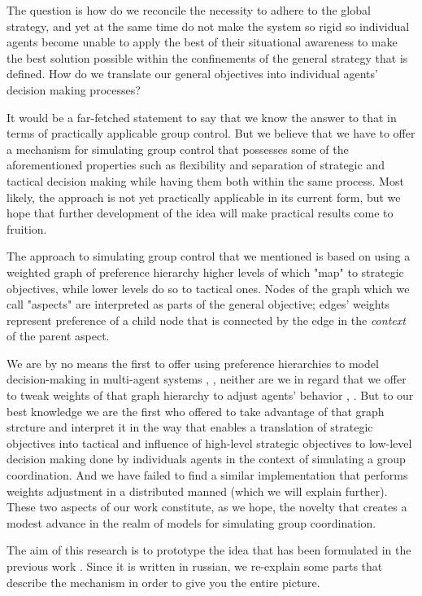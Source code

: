 The question is how do we reconcile the necessity to adhere to the global strategy, and yet at the same time do not make
the system so rigid so individual agents become unable to apply the best of their situational awareness to make the best
solution possible within the confinements of the general strategy that is defined. How do we translate our general
objectives into individual agents' decision making processes?

It would be a far-fetched statement to say that we know the answer to that in terms of practically applicable group
control. But we believe that we have to offer a mechanism for simulating group control that possesses some of the
aforementioned properties such as flexibility and separation of strategic and tactical decision making while having them
both within the same process. Most likely, the approach is not yet practically applicable in its current form, but we
hope that further development of the idea will make practical results come to fruition.

The approach to simulating group control that we mentioned is based on using a weighted graph of preference hierarchy
higher levels of which "map" to strategic objectives, while lower levels do so to tactical ones. Nodes of the graph
which we call "aspects" are interpreted as parts of the general objective; edges' weights represent preference of a
child node that is connected by the edge in the \textit{context} of the parent aspect.

We are by no means the first to offer using preference hierarchies to model decision-making in multi-agent systems
\cite{cartvehishvili-2018-model}, \cite{drakaki-2018-intelligent}, neither are we in regard that we offer to tweak
weights of that graph hierarchy to adjust agents' behavior \cite{zytniewski-2016-application},
\cite{brintrup-2010-behaviour}. But to our best knowledge we are the first who offered to take advantage of that graph
strcture and interpret it in the way that enables a translation of strategic objectives into tactical and influence of
high-level strategic objectives to low-level decision making done by individuals agents in the context of simulating a
group coordination. And we have failed to find a similar implementation that performs weights adjustment in a
distributed manned (which we will explain further). These two aspects of our work constitute, as we hope, the novelty
that creates a modest advance in the realm of models for simulating group coordination.

The aim of this research is to prototype the idea that has been formulated in the previous work
\cite{murashov-2021-ahp}. Since it is written in russian, we re-explain some parts that describe the mechanism in
order to give you the entire picture.

